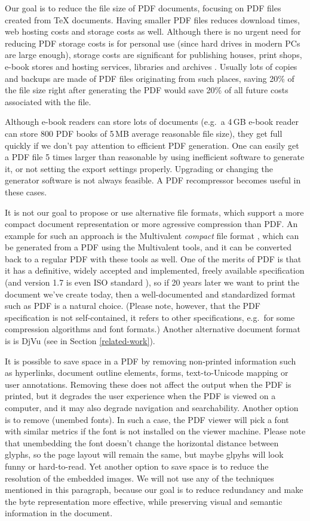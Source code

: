 \documentclass{article}
\begin{document}
Our goal is to reduce the file size of PDF documents, focusing on PDF files
created from \TeX{} documents. Having smaller PDF files reduces download
times, web hosting costs and storage costs as well. Although there is no
urgent need for reducing PDF storage costs is for personal use (since hard
drives in modern PCs are large enough), storage costs are significant for
publishing houses, print shops, e-book stores and hosting services,
libraries and archives \cite{multivalent-article}.
Usually lots of copies and backups are made of PDF
files originating from such places, saving 20\% of the file size right after
generating the PDF would save 20\% of all future costs associated with the
file.

Although e-book readers can store lots of documents (e.g.\ a 4\,GB e-book
reader can store 800 PDF books of 5\,MB average reasonable file size), they
get full quickly if we don't pay attention to efficient PDF generation. One
can easily get a PDF file 5 times larger than reasonable by using
inefficient software to generate it, or not setting the export settings
properly. Upgrading or changing the generator software is not always
feasible. A PDF recompressor becomes useful in these cases.

It is not our goal to propose or use
alternative file formats, which support a more
compact document representation or more agressive compression than PDF. An
example for such an approach is the Multivalent \emph{compact} file format
\cite{multivalent-compact}, which can be generated from a PDF using the
Multivalent tools, and it can be converted back to a regular PDF with these
tools as well. One of the merits of PDF is that it has a definitive, widely
accepted and implemented, freely available
specification \cite{pdfref} (and version 1.7 is
even ISO standard \cite{pdf-iso}), so if 20 years later we want to
print the document we've create today, then a well-documented and
standardized format such as PDF is a natural choice. (Please note, however,
that the PDF specification is not self-contained, it refers to other
specifications, e.g.\ for some compression algorithms and font formats.)
Another alternative document format is is DjVu (see in Section
\ref{related-work}).

It is possible to save space in a PDF by removing non-printed information
such as hyperlinks, document outline elements, forms, text-to-Unicode
mapping or user annotations. Removing these does not affect the output when
the PDF is printed, but it degrades the user experience when the PDF is
viewed on a computer, and it may also degrade navigation and searchability.
Another option is to remove (unembed fonts). In such a case, the PDF viewer
will pick a font with similar metrics if the font is not installed on the
viewer machine. Please note that unembedding the font doesn't change the
horizontal distance between glyphs, so the page layout will remain the
same, but maybe glpyhs will look funny or hard-to-read. Yet another option
to save space is to reduce the resolution of the embedded images. We will
not use any of the techniques mentioned in this paragraph, because our goal
is to reduce redundancy and make the byte representation more effective,
while preserving visual and semantic information in the document.
\end{document}
